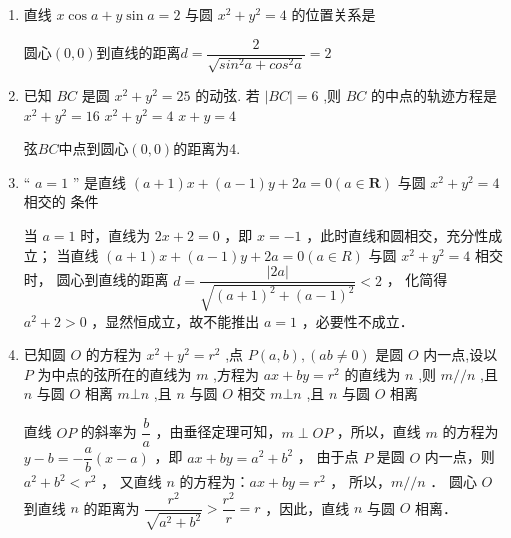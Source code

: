 \begin{enumerate}
    \item 直线 $x\cos a + y\sin a = 2$ 与圆 ${x}^{2} + {y}^{2} = 4$ 的位置关系是

    \begin{jieda}
        圆心$(0, 0)$到直线的距离$d = \dfrac{2}{\sqrt{sin^2a + cos^2a}} = 2$
    \end{jieda}


    \item 已知 ${BC}$ 是圆 ${x}^{2} + {y}^{2} = {25}$ 的动弦. 若 $\left| {BC}\right|  = 6$ ,则 ${BC}$ 的中点的轨迹方程是
    {${x}^{2} + {y}^{2} = {16}$ }
    {${x}^{2} + {y}^{2} = 4$ }
    {$x + y = 4$}
    \begin{jieda}
        弦$BC$中点到圆心$(0, 0)$的距离为4.
    \end{jieda}

     

    \item  “ $a = 1$ ” 是直线 $\left( {a + 1}\right) x + \left( {a - 1}\right) y + {2a} = 0\left( {a \in  \mathbf{R}}\right)$ 与圆 ${x}^{2} + {y}^{2} = 4$ 相交的 条件
    \begin{jieda}
        当 $a=1$ 时，直线为 $2 x+2=0$ ，即 $x=-1$ ，此时直线和圆相交，充分性成立；
    当直线 $(a+1) x+(a-1) y+2 a=0(a \in R)$ 与圆 $x^2+y^2=4$ 相交时，
    圆心到直线的距离 $d=\dfrac{|2 a|}{\sqrt{(a+1)^2+(a-1)^2}}<2$ ，
    化简得 $a^2+2>0$ ，显然恒成立，故不能推出 $a=1$ ，必要性不成立．
    \end{jieda}

    \item 已知圆 $O$ 的方程为 ${x}^{2} + {y}^{2} = {r}^{2}$ ,点 $P\left( {a,b}\right) ,\left( {{ab} \neq  0}\right)$ 是圆 $O$ 内一点,设以 $P$ 为中点的弦所在的直线为 $m$ ,方程为 ${ax} + {by} = {r}^{2}$ 的直线为 $n$ ,则
    {$m//n$ ,且 $n$ 与圆 $O$ 相离}
    {$m\bot n$ ,且 $n$ 与圆 $O$ 相交}
    {$m\bot n$ ,且 $n$ 与圆 $O$ 相离}
    \begin{jieda}
        直线 $O P$ 的斜率为 $\dfrac{b}{a}$ ，由垂径定理可知，$m \perp O P$ ，所以，直线 $m$ 的方程为 $y-b=-\dfrac{a}{b}(x-a)$ ，即 $a x+b y=a^2+b^2$ ，
由于点 $P$ 是圆 $O$ 内一点，则 $a^2+b^2<r^2$ ，
又直线 $n$ 的方程为：$a x+b y=r^2$ ，
所以，$m / / n$ ．
圆心 $O$ 到直线 $n$ 的距离为 $\dfrac{r^2}{\sqrt{a^2+b^2}}>\dfrac{r^2}{r}=r$ ，因此，直线 $n$ 与圆 $O$ 相离．
    \end{jieda}


\end{enumerate}
